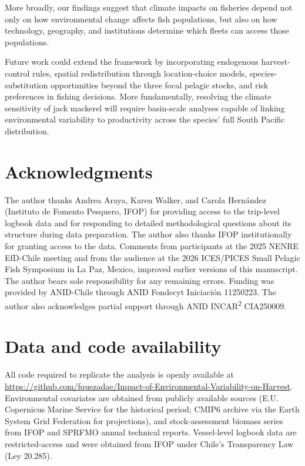\documentclass[
  11pt,
]{article}
\begin{document}
More broadly, our findings suggest that climate impacts on fisheries depend not only on how environmental change affects fish populations, but also on how technology, geography, and institutions determine which fleets can access those populations.

Future work could extend the framework by incorporating endogenous harvest-control rules, spatial redistribution through location-choice models, species-substitution opportunities beyond the three focal pelagic stocks, and risk preferences in fishing decisions. More fundamentally, resolving the climate sensitivity of jack mackerel will require basin-scale analyses capable of linking environmental variability to productivity across the species' full South Pacific distribution.

\section*{Acknowledgments}\label{acknowledgments}

The author thanks Andrea Araya, Karen Walker, and Carola Hernández (Instituto de Fomento Pesquero, IFOP) for providing access to the trip-level logbook data and for responding to detailed methodological questions about its structure during data preparation. The author also thanks IFOP institutionally for granting access to the data. Comments from participants at the 2025 NENRE EfD-Chile meeting and from the audience at the 2026 ICES/PICES Small Pelagic Fish Symposium in La Paz, Mexico, improved earlier versions of this manuscript. The author bears sole responsibility for any remaining errors. Funding was provided by ANID-Chile through ANID Fondecyt Iniciación 11250223. The author also acknowledges partial support through ANID INCAR\textsuperscript{2} CIA250009.

\section*{Data and code availability}\label{data-and-code-availability}

All code required to replicate the analysis is openly available at \url{https://github.com/fquezadae/Impact-of-Environmental-Variability-on-Harvest}. Environmental covariates are obtained from publicly available sources (E.U. Copernicus Marine Service for the historical period; CMIP6 archive via the Earth System Grid Federation for projections), and stock-assessment biomass series from IFOP and SPRFMO annual technical reports. Vessel-level logbook data are restricted-access and were obtained from IFOP under Chile's Transparency Law (Ley 20.285).
\end{document}
